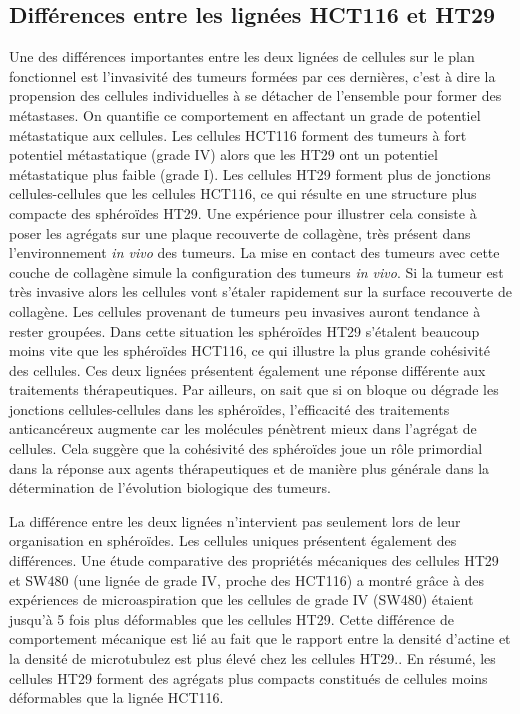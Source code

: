\subsection{Différences entre les lignées HCT116 et HT29}
Une des différences importantes entre les deux lignées de cellules sur le plan fonctionnel est l'invasivité des tumeurs formées par ces dernières, c'est à dire la propension des cellules individuelles à se détacher de l'ensemble pour former des métastases. On quantifie ce comportement en affectant un grade de potentiel métastatique aux cellules. Les cellules HCT116 forment des tumeurs à fort potentiel métastatique (grade IV) alors que les HT29 ont un potentiel métastatique plus faible (grade I).\cite{Pachenari2014} Les cellules HT29 forment plus de jonctions cellules-cellules que les cellules HCT116, ce qui résulte en une structure plus compacte des sphéroïdes HT29.\cite{El-Bahrawy2004} Une expérience pour illustrer cela consiste à poser les agrégats sur une plaque recouverte de collagène,\cite{Carlotta2017} très présent dans l'environnement \textit{in vivo} des tumeurs. La mise en contact des tumeurs avec cette couche de collagène simule la configuration des tumeurs \textit{in vivo}. Si la tumeur est très invasive alors les cellules vont s'étaler rapidement sur la surface recouverte de collagène. Les cellules provenant de tumeurs peu invasives auront tendance à rester groupées. Dans cette situation les sphéroïdes HT29 s'étalent beaucoup moins vite que les sphéroïdes HCT116, ce qui illustre la plus grande cohésivité des cellules. Ces deux lignées présentent également une réponse différente aux traitements thérapeutiques.\cite{Carlotta2017} Par ailleurs, on sait que si on bloque ou dégrade les jonctions cellules-cellules dans les sphéroïdes, l'efficacité des traitements anticancéreux augmente car les molécules pénètrent  mieux dans l'agrégat de cellules.\cite{Green149} Cela suggère que la cohésivité des sphéroïdes joue un rôle primordial dans la réponse aux agents thérapeutiques et de manière plus générale dans la détermination de l'évolution biologique des tumeurs.

 La différence entre les deux lignées n'intervient pas seulement lors de leur organisation en sphéroïdes. Les cellules uniques présentent également des différences. Une étude comparative des propriétés mécaniques des cellules HT29 et SW480 (une lignée de grade IV, proche des HCT116) a montré grâce à des expériences de microaspiration que les cellules de grade IV (SW480) étaient jusqu'à 5 fois plus déformables que les cellules HT29.\cite{Pachenari2014} Cette différence de comportement mécanique est lié au fait que le rapport entre la densité d'actine et la  densité de microtubulez est plus élevé chez les cellules HT29.\cite{Pachenari2014}. En résumé, les cellules HT29 forment des agrégats plus compacts constitués de cellules moins déformables que la lignée HCT116. 


